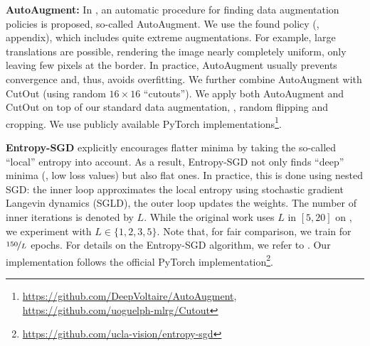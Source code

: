 \begin{table}[t]
	\label{tab:supp-convexity}
	\vspace*{-6px}
\end{table}

\textbf{AutoAugment:}
%
In \cite{CubukARXIV2018}, an automatic procedure for finding data augmentation policies is proposed, so-called AutoAugment. We use the found \CifarT policy (\cf \cite{CubukARXIV2018}, appendix), which includes quite extreme augmentations. For example, large translations are possible, rendering the image nearly completely uniform, only leaving few pixels at the border. In practice, AutoAugment usually prevents convergence and, thus, avoids overfitting. We further combine AutoAugment with CutOut \cite{DevriesARXIV2017} (using random $16\times 16$ ``cutouts''). We apply both AutoAugment and CutOut on top of our standard data augmentation, \ie, random flipping and cropping. We use publicly available PyTorch implementations\footnote{\url{https://github.com/DeepVoltaire/AutoAugment}, \url{https://github.com/uoguelph-mlrg/Cutout}}.

\textbf{Entropy-SGD}
%
\cite{ChaudhariICLR2017} explicitly encourages flatter minima by taking the so-called ``local'' entropy into account. As a result, Entropy-SGD not only finds ``deep'' minima (\ie, low loss values) but also flat ones. In practice, this is done using nested SGD: the inner loop approximates the local entropy using stochastic gradient Langevin dynamics (SGLD), the outer loop updates the weights. The number of inner iterations is denoted by $L$. While the original work \cite{ChaudhariICLR2017} uses $L$ in $[5, 20]$ on \CifarT, we experiment with $L \in \{1, 2, 3, 5\}$. Note that, for fair comparison, we train for $\nicefrac{150}{L}$ epochs.
For details on the Entropy-SGD algorithm, we refer to \cite{ChaudhariICLR2017}. Our implementation follows the official PyTorch implementation\footnote{\url{https://github.com/ucla-vision/entropy-sgd}}.

